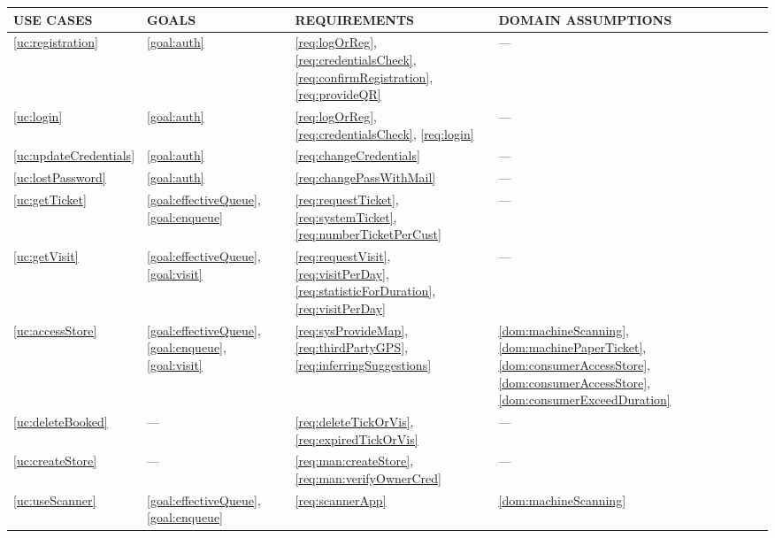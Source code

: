 \documentclass[a4paper, 12pt, oneside]{article}
\begin{document}
\begin{enumerate}[labelindent=20pt, label={UC.\arabic*}, itemindent=1em,leftmargin=!]
\begin{tabularx}{\linewidth}{| p{20mm} | p{20mm} | p{35mm} | p{50mm} |}

     \hline
	USE CASES & GOALS & REQUIREMENTS & DOMAIN ASSUMPTIONS \\
	 \hline
	\ref{uc:registration} & \ref{goal:auth} & \ref{req:logOrReg}, \ref{req:credentialsCheck}, \ref{req:confirmRegistration}, \ref{req:provideQR}  & ---\\
	
	 \hline
	\ref{uc:login} & \ref{goal:auth} & \ref{req:logOrReg}, \ref{req:credentialsCheck}, \ref{req:login} & --- \\
	
	\hline
	\ref{uc:updateCredentials} & \ref{goal:auth} & \ref{req:changeCredentials} & --- \\

	\hline
	\ref{uc:lostPassword} & \ref{goal:auth} & \ref{req:changePassWithMail} & --- \\
	
	\hline
	\ref{uc:getTicket} & \ref{goal:effectiveQueue}, \ref{goal:enqueue} & \ref{req:requestTicket}, \ref{req:systemTicket}, \ref{req:numberTicketPerCust} & --- \\
	\hline
	
	\ref{uc:getVisit} & \ref{goal:effectiveQueue}, \ref{goal:visit} & \ref{req:requestVisit}, \ref{req:visitPerDay}, \ref{req:statisticForDuration}, \ref{req:visitPerDay} & --- \\
	\hline
	
	\ref{uc:accessStore} & \ref{goal:effectiveQueue}, \ref{goal:enqueue}, \ref{goal:visit} & \ref{req:sysProvideMap}, \ref{req:thirdPartyGPS}, \ref{req:inferringSuggestions} & \ref{dom:machineScanning}, \ref{dom:machinePaperTicket}, \ref{dom:consumerAccessStore}, \ref{dom:consumerAccessStore}, \ref{dom:consumerExceedDuration} \\
	\hline
	
	\ref{uc:deleteBooked} & --- & \ref{req:deleteTickOrVis}, \ref{req:expiredTickOrVis} & --- \\
    \hline
    
    \ref{uc:createStore} & --- & \ref{req:man:createStore}, \ref{req:man:verifyOwnerCred} & --- \\
    \hline
    
    \ref{uc:useScanner} & \ref{goal:effectiveQueue}, \ref{goal:enqueue} & \ref{req:scannerApp} & \ref{dom:machineScanning}\\
    \hline
    

\end{tabularx}
\end{enumerate}
\end{document}
